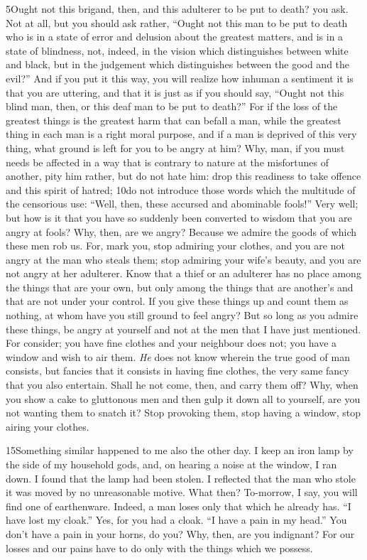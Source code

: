 5Ought not this brigand, then, and this adulterer to be put to death? you ask. Not at all, but you should ask rather, ``Ought not this man to be put to death who is in a state of error and delusion about the greatest matters, and is in a state of blindness, not, indeed, in the vision which distinguishes between white and black, but in the judgement which distinguishes between the good and the evil?'' And if you put it this way, you will realize how inhuman a sentiment it is that you are uttering, and that it is just as if you should say, ``Ought not this blind man, then, or this deaf man to be put to death?'' For if the loss of the greatest things is the greatest harm that can befall a man, while the greatest thing in each man is a right moral purpose, and if a man is deprived of this very thing, what ground is left for you to be angry at him? Why, man, if you must needs be affected in a way that is contrary to nature at the misfortunes of another, pity him rather, but do not hate him: drop this readiness to take offence and this spirit of hatred; 10do not introduce those words which the multitude of the censorious use: ``Well, then, these accursed and abominable fools!'' Very well; but how is it that you have so suddenly been converted to wisdom that you are angry at fools? Why, then, are we angry? Because we admire the goods of which these men rob us. For, mark you, stop admiring your clothes, and you are not angry at the man who steals them; stop admiring your wife's beauty, and you are not angry at her adulterer. Know that a thief or an adulterer has no place among the things that are your own, but only among the things that are another's and that are not under your control. If you give these things up and count them as nothing, at whom have you still ground to feel angry? But so long as you admire these things, be angry at yourself and not at the men that I have just mentioned. For consider; you have fine clothes and your neighbour does not; you have a window and wish to air them. \emph{He} does not know wherein the true good of man consists, but fancies that it consists in having fine clothes, the very same fancy that you also entertain. Shall he not come, then, and carry them off? Why, when you show a cake to gluttonous men and then gulp it down all to yourself, are you not wanting them to snatch it? Stop provoking them, stop having a window, stop airing your clothes.

15Something similar happened to me also the other day. I keep an iron lamp by the side of my household gods, and, on hearing a noise at the window, I ran down. I found that the lamp had been stolen. I reflected that the man who stole it was moved by no unreasonable motive. What then? To-morrow, I say, you will find one of earthenware. Indeed, a man loses only that which he already has. ``I have lost my cloak.'' Yes, for you had a cloak. ``I have a pain in my head.'' You don't have a pain in your horns, do you? Why, then, are you indignant? For
our losses and our pains have to do only with the things which we possess.


